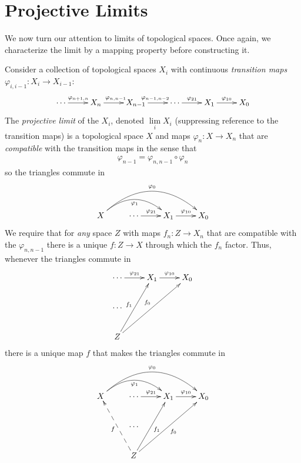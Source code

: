     \section{Projective Limits}
      We now turn our attention to limits of topological spaces.
      Once again, we characterize the limit by a mapping property before constructing it.
      \begin{defn}
        \label{defn:projlim}
        Consider a collection of topological spaces $X_i$ with continuous \emph{transition maps} $\varphi_{i,i-1}:X_i\rightarrow X_{i-1}$:
        \begin{displaymath}
          \xymatrix{
            \cdots \ar[r]^{\varphi_{n+1,n}} & X_n \ar[r]^{\varphi_{n,n-1}} & X_{n-1} \ar[r]^{\varphi_{n-1,n-2}} & \cdots \ar[r]^{\varphi_{21}} & X_1 \ar[r]^{\varphi_{10}} & X_0
          }
        \end{displaymath}
        The \emph{projective limit} of the $X_i$, denoted $\lim\limits_i X_i$ (suppressing reference to the transition maps) is a topological space $X$ and maps $\varphi_n:X\rightarrow X_n$ that are \emph{compatible} with the transition maps in the sense that 
        \begin{align*}
          \varphi_{n-1}=\varphi_{n,n-1}\circ\varphi_n
        \end{align*}
        so the triangles commute in
        \begin{displaymath}
          \xymatrix{
            X \ar@/^20pt/[rr]_{\varphi_1} \ar@/^30pt/[rrr]^{\varphi_0}
            & \cdots \ar[r]^{\varphi_{21}}
            & X_1 \ar[r]^{\varphi_{10}}
            & X_0
          }
        \end{displaymath}
        We require that for \emph{any} space $Z$ with maps $f_n:Z\rightarrow X_n$ that are compatible with the $\varphi_{n,n-1}$ there is a unique $f:Z\rightarrow X$ through which the $f_n$ factor.
        Thus, whenever the triangles commute in
        \begin{displaymath}
          \xymatrix{
             \cdots \ar[r]^{\varphi_{21}}
            & X_1 \ar[r]^{\varphi_{10}}
            & X_0
            \\ \cdots \\
            Z \ar[uur]^{f_1} \ar[uurr]^{f_0}
          }
        \end{displaymath}
        there is a unique map $f$ that makes the triangles commute in
        \begin{displaymath}
          \xymatrix{
            X \ar@/^20pt/[rr]_{\varphi_1} \ar@/^30pt/[rrr]^{\varphi_0}
            & \cdots \ar[r]^{\varphi_{21}}
            & X_1 \ar[r]^{\varphi_{10}}
            & X_0
            \\ & \cdots \\
            & Z \ar@{-->}[uul]^f \ar[uur]_{f_1} \ar[uurr]_{f_0}
          }
        \end{displaymath}
      \end{defn}

